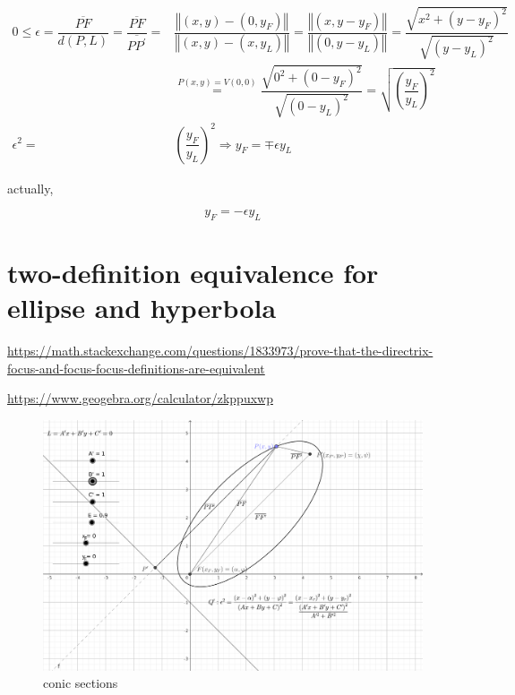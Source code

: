 \documentclass[
]{book}
\theoremstyle{definition}
\theoremstyle{definition}
\theoremstyle{definition}
\theoremstyle{definition}
\theoremstyle{remark}
\begin{document}
\[
\begin{aligned}
0\le\epsilon=\dfrac{\overline{PF}}{d\left(P,L\right)}=\dfrac{\overline{PF}}{\overline{PP^{\prime}}}= & \dfrac{\left\Vert \left(x,y\right)-\left(0,y_{{\scriptscriptstyle F}}\right)\right\Vert }{\left\Vert \left(x,y\right)-\left(x,y_{{\scriptscriptstyle L}}\right)\right\Vert }=\dfrac{\left\Vert \left(x,y-y_{{\scriptscriptstyle F}}\right)\right\Vert }{\left\Vert \left(0,y-y_{{\scriptscriptstyle L}}\right)\right\Vert }=\dfrac{\sqrt{x^{2}+\left(y-y_{{\scriptscriptstyle F}}\right)^{2}}}{\sqrt{\left(y-y_{{\scriptscriptstyle L}}\right)^{2}}}\\
 & \overset{P\left(x,y\right)=V\left(0,0\right)}{=}\dfrac{\sqrt{0^{2}+\left(0-y_{{\scriptscriptstyle F}}\right)^{2}}}{\sqrt{\left(0-y_{{\scriptscriptstyle L}}\right)^{2}}}=\sqrt{\left(\dfrac{y_{{\scriptscriptstyle F}}}{y_{{\scriptscriptstyle L}}}\right)^{2}}\\
\epsilon^{2}= & \left(\dfrac{y_{{\scriptscriptstyle F}}}{y_{{\scriptscriptstyle L}}}\right)^{2}\Rightarrow y_{{\scriptscriptstyle F}}=\mp\epsilon y_{{\scriptscriptstyle L}}
\end{aligned}
\]

actually,

\[
y_{{\scriptscriptstyle F}}=-\epsilon y_{{\scriptscriptstyle L}}
\]

\hypertarget{two-definition-equivalence-for-ellipse-and-hyperbola}{%
\section{two-definition equivalence for ellipse and hyperbola}\label{two-definition-equivalence-for-ellipse-and-hyperbola}}

\url{https://math.stackexchange.com/questions/1833973/prove-that-the-directrix-focus-and-focus-focus-definitions-are-equivalent}

\url{https://www.geogebra.org/calculator/zkppuxwp}

\begin{figure}
\includegraphics[width=0.75\linewidth]{img/conic-sections} \caption{conic sections}\label{fig:unnamed-chunk-3}
\end{figure}
\end{document}
